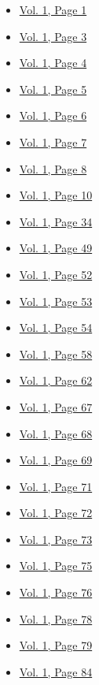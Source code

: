 \begin{itemize}
  \begin{itemize}
  \tightlist
  \item
    \protect\hyperlink{g-page-9}{Vol. 1, Page 1}
  \item
    \protect\hyperlink{g-page-11}{Vol. 1, Page 3}
  \item
    \protect\hyperlink{g-page-12}{Vol. 1, Page 4}
  \item
    \protect\hyperlink{g-page-13}{Vol. 1, Page 5}
  \item
    \protect\hyperlink{g-page-14}{Vol. 1, Page 6}
  \item
    \protect\hyperlink{g-page-15}{Vol. 1, Page 7}
  \item
    \protect\hyperlink{g-page-16}{Vol. 1, Page 8}
  \item
    \protect\hyperlink{g-page-18}{Vol. 1, Page 10}
  \item
    \protect\hyperlink{g-page-42}{Vol. 1, Page 34}
  \item
    \protect\hyperlink{g-page-57}{Vol. 1, Page 49}
  \item
    \protect\hyperlink{g-page-60}{Vol. 1, Page 52}
  \item
    \protect\hyperlink{g-page-61}{Vol. 1, Page 53}
  \item
    \protect\hyperlink{g-page-62}{Vol. 1, Page 54}
  \item
    \protect\hyperlink{g-page-66}{Vol. 1, Page 58}
  \item
    \protect\hyperlink{g-page-70}{Vol. 1, Page 62}
  \item
    \protect\hyperlink{g-page-75}{Vol. 1, Page 67}
  \item
    \protect\hyperlink{g-page-76}{Vol. 1, Page 68}
  \item
    \protect\hyperlink{g-page-77}{Vol. 1, Page 69}
  \item
    \protect\hyperlink{g-page-79}{Vol. 1, Page 71}
  \item
    \protect\hyperlink{g-page-80}{Vol. 1, Page 72}
  \item
    \protect\hyperlink{g-page-81}{Vol. 1, Page 73}
  \item
    \protect\hyperlink{g-page-83}{Vol. 1, Page 75}
  \item
    \protect\hyperlink{g-page-84}{Vol. 1, Page 76}
  \item
    \protect\hyperlink{g-page-86}{Vol. 1, Page 78}
  \item
    \protect\hyperlink{g-page-87}{Vol. 1, Page 79}
  \item
    \protect\hyperlink{g-page-92}{Vol. 1, Page 84}

\end{itemize}
\end{itemize}
